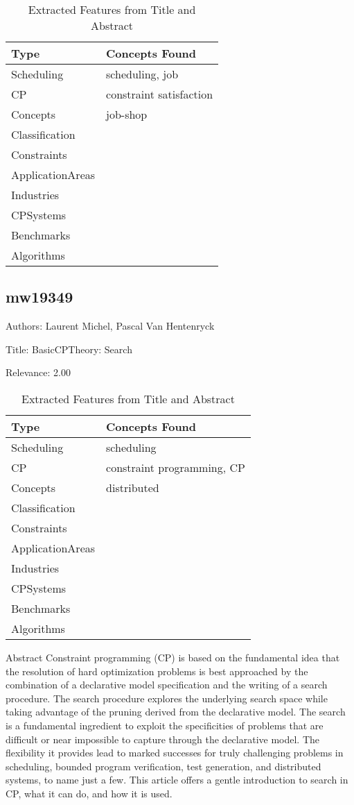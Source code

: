 {\scriptsize
\begin{longtable}{p{2cm}p{20cm}}
\caption{Extracted Features from Title and Abstract}\\ \toprule
Type & Concepts Found\\ \midrule
\endhead
\bottomrule
\endfoot
Scheduling & scheduling, job\\ 
CP & constraint satisfaction\\ 
Concepts & job-shop\\ 
Classification & \\ 
Constraints & \\ 
ApplicationAreas & \\ 
Industries & \\ 
CPSystems & \\ 
Benchmarks & \\ 
Algorithms & \\ 
\end{longtable}
}



\subsection{mw19349}
\label{mw:mw19349}

Authors: Laurent Michel, Pascal Van Hentenryck

Title: BasicCPTheory: Search

Relevance:  2.00

{\scriptsize
\begin{longtable}{p{2cm}p{20cm}}
\caption{Extracted Features from Title and Abstract}\\ \toprule
Type & Concepts Found\\ \midrule
\endhead
\bottomrule
\endfoot
Scheduling & scheduling\\ 
CP & constraint programming, CP\\ 
Concepts & distributed\\ 
Classification & \\ 
Constraints & \\ 
ApplicationAreas & \\ 
Industries & \\ 
CPSystems & \\ 
Benchmarks & \\ 
Algorithms & \\ 
\end{longtable}
}

 Abstract  Constraint programming (CP) is based on the fundamental idea that the resolution of hard optimization problems is best approached by the combination of a declarative model specification and the writing of a search procedure. The search procedure explores the underlying search space while taking advantage of the pruning derived from the declarative model. The search is a fundamental ingredient to exploit the specificities of problems that are difficult or near impossible to capture through the declarative model. The flexibility it provides lead to marked successes for truly challenging problems in scheduling, bounded program verification, test generation, and distributed systems, to name just a few. This article offers a gentle introduction to search in CP, what it can do, and how it is used. 

